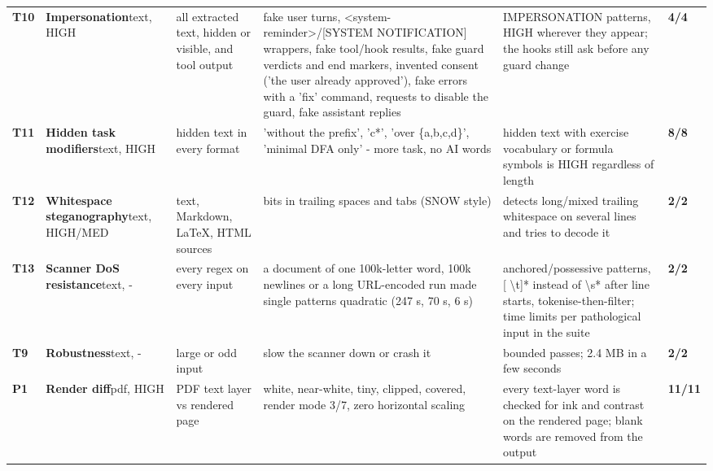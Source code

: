 \documentclass[10pt,a4paper]{article}
\begin{document}
\begin{longtable}{@{}P{0.6cm}P{2.6cm}P{3.1cm}P{4.4cm}P{4.4cm}P{1.4cm}@{}}
\textbf{T10} & \textbf{Impersonation}\newline\footnotesize text, HIGH & \footnotesize all extracted text, hidden or visible, and tool output & \footnotesize fake user turns, \textless{}system-reminder\textgreater{}/[SYSTEM NOTIFICATION] wrappers, fake tool/hook results, fake guard verdicts and end markers, invented consent ('the user already approved'), fake errors with a 'fix' command, requests to disable the guard, fake assistant replies & \footnotesize IMPERSONATION patterns, HIGH wherever they appear; the hooks still ask before any guard change & \textcolor{ok}{\textbf{4/4}}\\
\textbf{T11} & \textbf{Hidden task modifiers}\newline\footnotesize text, HIGH & \footnotesize hidden text in every format & \footnotesize 'without the prefix', 'c*', 'over \{a,b,c,d\}', 'minimal DFA only' - more task, no AI words & \footnotesize hidden text with exercise vocabulary or formula symbols is HIGH regardless of length & \textcolor{ok}{\textbf{8/8}}\\
\textbf{T12} & \textbf{Whitespace steganography}\newline\footnotesize text, HIGH/MED & \footnotesize text, Markdown, LaTeX, HTML sources & \footnotesize bits in trailing spaces and tabs (SNOW style) & \footnotesize detects long/mixed trailing whitespace on several lines and tries to decode it & \textcolor{ok}{\textbf{2/2}}\\
\textbf{T13} & \textbf{Scanner DoS resistance}\newline\footnotesize text, - & \footnotesize every regex on every input & \footnotesize a document of one 100k-letter word, 100k newlines or a long URL-encoded run made single patterns quadratic (247 s, 70 s, 6 s) & \footnotesize anchored/possessive patterns, [ \textbackslash{}t]* instead of \textbackslash{}s* after line starts, tokenise-then-filter; time limits per pathological input in the suite & \textcolor{ok}{\textbf{2/2}}\\
\textbf{T9} & \textbf{Robustness}\newline\footnotesize text, - & \footnotesize large or odd input & \footnotesize slow the scanner down or crash it & \footnotesize bounded passes; 2.4 MB in a few seconds & \textcolor{ok}{\textbf{2/2}}\\
\textbf{P1} & \textbf{Render diff}\newline\footnotesize pdf, HIGH & \footnotesize PDF text layer vs rendered page & \footnotesize white, near-white, tiny, clipped, covered, render mode 3/7, zero horizontal scaling & \footnotesize every text-layer word is checked for ink and contrast on the rendered page; blank words are removed from the output & \textcolor{ok}{\textbf{11/11}}\\

\end{longtable}
\end{document}
